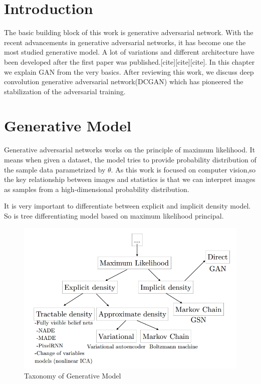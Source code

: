 

\section{Introduction}

The basic building block of this work is generative adversarial network. With the recent advancements in generative adversarial networks, it has become one the most studied generative model. A lot of variations and different architecture have been developed after the first paper was published.[cite][cite][cite]. In this chapter we explain GAN from the very basics. After reviewing this work, we discuss deep convolution generative adversarial network(DCGAN) which has pioneered the stabilization of the adversarial training.

\section{Generative Model}

Generative adversarial networks works on the principle of maximum likelihood.
It means when given a dataset, the model tries to provide probability distribution of the sample data parametrized by $\theta$. As this work is focused on computer vision,so the key relationship between images and statistics is that we can interpret images as samples from a high-dimensional probability distribution.
\par
It is very important to differentiate between explicit and implicit density model. So is tree differentiating  model based on maximum likelihood 
principal.
%
\begin{figure}[h]
    
    \includegraphics[scale=.6, angle=0]{Files/taxanomy.png}
    \caption[The panther]{Taxonomy of Generative Model\cite{GanTut}}
    \label{fig: jordan}
\end{figure}

